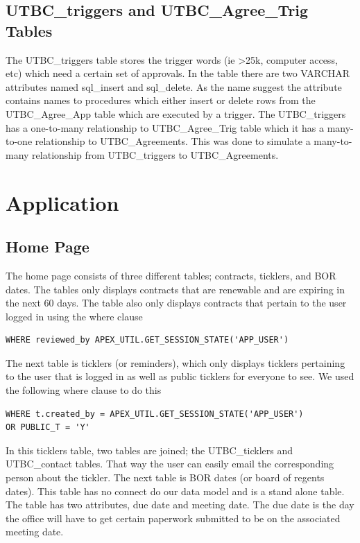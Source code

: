 \documentclass{report}
\begin{document}
\section{UTBC\_triggers and UTBC\_Agree\_Trig Tables}
The UTBC\_triggers table stores the trigger words (ie  >25k, computer access, etc) which need a certain set of approvals. In the table there are two VARCHAR attributes named sql\_insert and sql\_delete. As the name suggest the attribute contains names to procedures which either insert or delete rows from the UTBC\_Agree\_App table which are executed by a trigger. The UTBC\_triggers has a one-to-many relationship to UTBC\_Agree\_Trig table which it has a many-to-one relationship to UTBC\_Agreements. This was done to simulate a many-to-many relationship from UTBC\_triggers to UTBC\_Agreements. 

\chapter{Application}

\section{Home Page}
The home page consists of three different tables; contracts, ticklers, and BOR dates. The tables only displays contracts that are renewable and are expiring in the next 60 days. The table also only displays contracts that pertain to the user logged in using the where clause

\begin{lstlisting}[caption=Contracts table where clause for user]
WHERE reviewed_by APEX_UTIL.GET_SESSION_STATE('APP_USER')
\end{lstlisting}

The next table is ticklers (or reminders), which only displays ticklers pertaining to the user that is logged in as well as public ticklers for everyone to see. We used the following where clause to do this

\begin{lstlisting}[caption=Tickler table where clause]
WHERE t.created_by = APEX_UTIL.GET_SESSION_STATE('APP_USER')
OR PUBLIC_T = 'Y'
\end{lstlisting}

In this ticklers table, two tables are joined; the UTBC\_ticklers and UTBC\_contact tables. That way the user can easily email the corresponding person about the tickler. 
The next table is BOR dates (or board of regents dates). This table has no connect do our data model and is a stand alone table. The table has two attributes, due date and meeting date. The due date is the day the office will have to get certain paperwork submitted to be on the associated meeting date.
\end{document}
